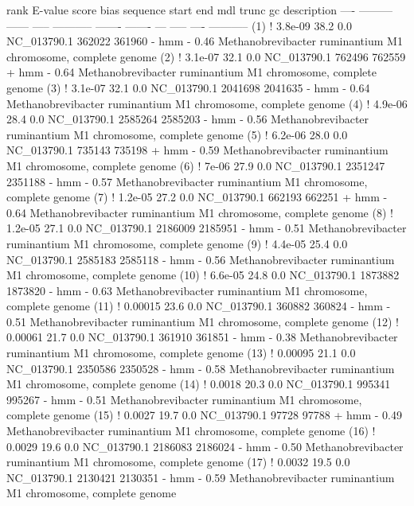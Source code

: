 \begin{sreoutput}
 rank     E-value  score  bias  sequence      start     end   mdl trunc   gc  description
 ----   --------- ------ -----  ----------- ------- -------   --- ----- ----  -----------
  (1) !   3.8e-09   38.2   0.0  NC_013790.1  362022  361960 - hmm     - 0.46  Methanobrevibacter ruminantium M1 chromosome, complete genome
  (2) !   3.1e-07   32.1   0.0  NC_013790.1  762496  762559 + hmm     - 0.64  Methanobrevibacter ruminantium M1 chromosome, complete genome
  (3) !   3.1e-07   32.1   0.0  NC_013790.1 2041698 2041635 - hmm     - 0.64  Methanobrevibacter ruminantium M1 chromosome, complete genome
  (4) !   4.9e-06   28.4   0.0  NC_013790.1 2585264 2585203 - hmm     - 0.56  Methanobrevibacter ruminantium M1 chromosome, complete genome
  (5) !   6.2e-06   28.0   0.0  NC_013790.1  735143  735198 + hmm     - 0.59  Methanobrevibacter ruminantium M1 chromosome, complete genome
  (6) !     7e-06   27.9   0.0  NC_013790.1 2351247 2351188 - hmm     - 0.57  Methanobrevibacter ruminantium M1 chromosome, complete genome
  (7) !   1.2e-05   27.2   0.0  NC_013790.1  662193  662251 + hmm     - 0.64  Methanobrevibacter ruminantium M1 chromosome, complete genome
  (8) !   1.2e-05   27.1   0.0  NC_013790.1 2186009 2185951 - hmm     - 0.51  Methanobrevibacter ruminantium M1 chromosome, complete genome
  (9) !   4.4e-05   25.4   0.0  NC_013790.1 2585183 2585118 - hmm     - 0.56  Methanobrevibacter ruminantium M1 chromosome, complete genome
 (10) !   6.6e-05   24.8   0.0  NC_013790.1 1873882 1873820 - hmm     - 0.63  Methanobrevibacter ruminantium M1 chromosome, complete genome
 (11) !   0.00015   23.6   0.0  NC_013790.1  360882  360824 - hmm     - 0.51  Methanobrevibacter ruminantium M1 chromosome, complete genome
 (12) !   0.00061   21.7   0.0  NC_013790.1  361910  361851 - hmm     - 0.38  Methanobrevibacter ruminantium M1 chromosome, complete genome
 (13) !   0.00095   21.1   0.0  NC_013790.1 2350586 2350528 - hmm     - 0.58  Methanobrevibacter ruminantium M1 chromosome, complete genome
 (14) !    0.0018   20.3   0.0  NC_013790.1  995341  995267 - hmm     - 0.51  Methanobrevibacter ruminantium M1 chromosome, complete genome
 (15) !    0.0027   19.7   0.0  NC_013790.1   97728   97788 + hmm     - 0.49  Methanobrevibacter ruminantium M1 chromosome, complete genome
 (16) !    0.0029   19.6   0.0  NC_013790.1 2186083 2186024 - hmm     - 0.50  Methanobrevibacter ruminantium M1 chromosome, complete genome
 (17) !    0.0032   19.5   0.0  NC_013790.1 2130421 2130351 - hmm     - 0.59  Methanobrevibacter ruminantium M1 chromosome, complete genome

\end{sreoutput}
